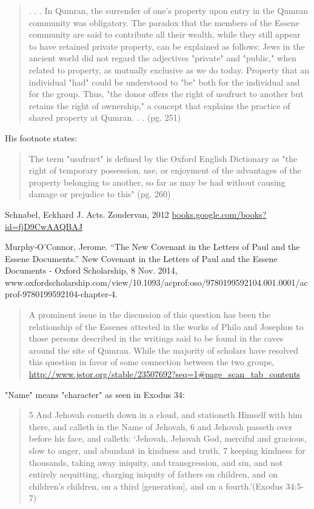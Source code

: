 \documentclass[11pt]{article}
\begin{document}
\begin{thebibliography}{37}
\begin{quote}
. . . In Qumran, the surrender of one's property upon entry in the Qumran community was obligatory. The paradox that the members of the Essene community are said to contribute all their wealth, while they still appear to have retained private property, can be explained as follows: Jews in the ancient world did not regard the adjectives "private" and "public," when related to property, as mutually exclusive as we do today. Property that an individual "had" could be understood to "be" both for the individual and for the group. Thus, "the donor offers the right of usufruct to another but retains the right of ownership," a concept that explains the practice of shared property at Qumran. . . 
(pg. 251)
\end{quote}
His footnote states: 
\begin{quote}
The term "usufruct" is defined by the Oxford English Dictionary as "the right of temporary possession, use, or enjoyment of the advantages of the property belonging to another, so far as may be had without causing damage or prejudice to this" (pg. 260)
\end{quote}
Schnabel, Eckhard J. Acts. Zondervan, 2012
\url{books.google.com/books?id=fjD9CwAAQBAJ}

Murphy‐O'Connor, Jerome. “The New Covenant in the Letters of Paul and the Essene Documents.” New Covenant in the Letters of Paul and the Essene Documents - Oxford Scholarship, 8 Nov. 2014, www.oxfordscholarship.com/view/10.1093/acprof:oso/9780199592104.001.0001/acprof-9780199592104-chapter-4.

\begin{quote}
A prominent issue in the discussion of this question has been the relationship of the Essenes attested in the works of Philo and Josephus to those persons described in the writings said to be found in the caves around the site of Qumran. While the majority of scholars have resolved this question in favor of some connection between the two groups, \url{http://www.jstor.org/stable/23507692?seq=1#page_scan_tab_contents}
\end{quote}

"Name" means "character" as seen in Exodus 34:
\begin{quote}
5 And Jehovah cometh down in a cloud, and stationeth Himself with him there, and calleth in the Name of Jehovah,
6 and Jehovah passeth over before his face, and calleth: `Jehovah, Jehovah God, merciful and gracious, slow to anger, and abundant in kindness and truth,
7 keeping kindness for thousands, taking away iniquity, and transgression, and sin, and not entirely acquitting, charging iniquity of fathers on children, and on children's children, on a third [generation], and on a fourth.'(Exodus 34:5-7)
\end{quote}


\end{thebibliography}
\end{document}
